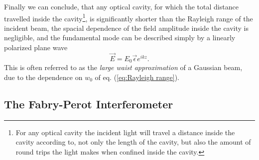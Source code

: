 Finally we can conclude, that any optical cavity, for which the total distance travelled inside the cavity\footnote{For any optical cavity the incident light will travel a distance inside the cavity according to, not only the length of the cavity, but also the amount of round trips the light makes when confined inside the cavity.}, is significantly shorter than the Rayleigh range of the incident beam, the spacial dependence of the field amplitude inside the cavity is negligible, and the fundamental mode can be described simply by a linearly polarized plane wave
\begin{equation}
    \vec{E} = E_0 \vec{\epsilon} e^{ikz}.
\end{equation}
This is often referred to as the \emph{large waist approximation} of a Gaussian beam, due to the dependence on $w_0$ of eq. (\ref{eq:Rayleigh range}).


\subsection{The Fabry-Perot Interferometer}